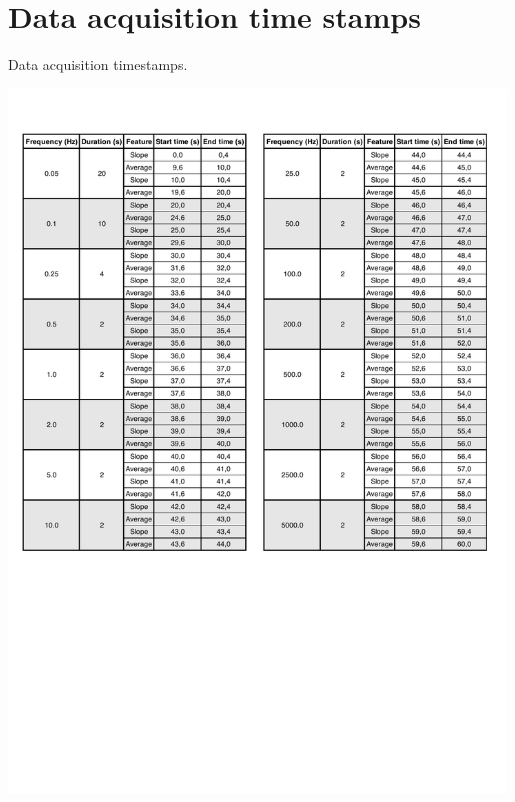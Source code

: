 
\appendix


\chapter{Data acquisition time stamps}
\label{app:A}
	
	\begin{table}[!htb]
		
		\centering
		\caption{Data acquisition timestamps.}
		\includegraphics[width=0.99\textwidth]{../figures/timestamps.pdf}
		\label{fig:timestamps}
		
	\end{table}
%